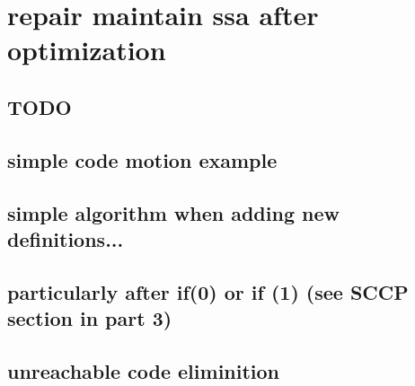 \applynumberofpages\chapter{repair maintain ssa after optimization }
\section{TODO}

\section{simple code motion example}
\section{simple algorithm when adding new definitions...}
\section{particularly after if(0) or if (1) (see SCCP section in part 3)}
\section{unreachable code eliminition}


